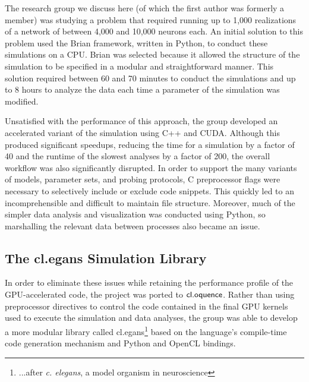 \documentclass{llncs}
\begin{document}
The research group we discuss here (of which the first author was formerly a member) was studying a problem that required running up to 1,000 realizations of a network of between 4,000 and 10,000 neurons each. An initial solution to this problem used the Brian framework, written in Python, to conduct these simulations on a CPU. Brian was selected because it allowed the structure of the  simulation to be specified in a modular and straightforward manner. This solution required between 60 and 70 minutes to conduct the simulations and up to 8 hours to analyze the data each time a parameter of the simulation was modified.

Unsatisfied with the performance of this approach, the group developed an accelerated variant of the simulation using C++ and CUDA. Although this produced significant speedups, reducing the time for a simulation by a factor of 40 and the runtime of the slowest analyses by a factor of 200, the overall workflow was also significantly disrupted. In order to support the many variants of models, parameter sets, and probing protocols, C preprocessor flags were necessary to selectively include or exclude code snippets. This quickly led to an incomprehensible and difficult to maintain file structure. Moreover, much of the simpler data analysis and visualization was conducted using Python, so marshalling the relevant data between processes also became an issue. 

\subsection{The {\sf cl.egans} Simulation Library}
In order to eliminate these issues while retaining the performance profile of the GPU-accelerated code, the project was ported to $\textsf{cl.oquence}$. Rather than using preprocessor directives to control the code contained in the final GPU kernels used to execute the simulation and data analyses, the group was able to develop a more modular  library called {\sf cl.egans}\footnote{...after {\it c. elegans}, a model organism in neuroscience} based on the language's compile-time code generation mechanism and Python and OpenCL bindings.
\end{document}
